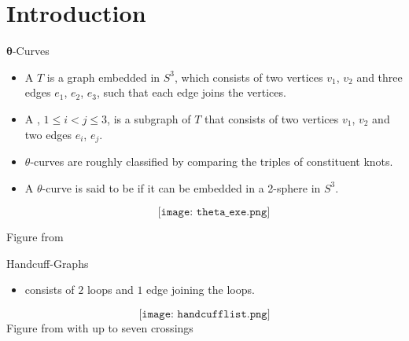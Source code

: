 \section{Introduction}
\begin{frame}{$\mathbf{\theta}$-Curves}
	\begin{itemize}
		\item A  $T$ is a graph embedded in $S^3$,
		which consists of two vertices $v_1$, $v_2$
		and three edges $e_1$, $e_2$, $e_3$,
		such that each edge joins the vertices.
		\item A , $1 \le i < j \le 3$, is a subgraph of $T$
		that consists of two vertices $v_1$, $v_2$ and two edges $e_i$, $e_j$.
		
		\item $\theta$-curves are roughly classified by comparing the triples of constituent knots.
		
		\item A $\theta$-curve is said to be  if it can be embedded in a 2-sphere in $S^3$.

		$$\texttt{[image: theta\_exe.png]}$$
	\end{itemize}
	
	\seprule
	\hfill\tiny{Figure from \cite{theta_7}}
\end{frame}

\begin{frame}{Handcuff-Graphs}
	\begin{itemize}
		\item {} consists of $2$ loops and $1$ edge joining the loops.
	\end{itemize}

	$$\texttt{[image: handcufflist.png]}$$
	\seprule
	\hfill\tiny{Figure from \cite{handcufflist}}
with up to seven crossings
\end{frame}

